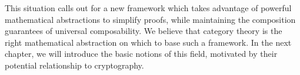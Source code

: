 This situation calls out for a new framework which takes advantage of powerful
mathematical abstractions to simplify proofs, while maintaining the composition
guarantees of universal composability. We believe that category theory is the
right mathematical abstraction on which to base such a framework. In the next
chapter, we will introduce the basic notions of this field, motivated by their
potential relationship to cryptography.
